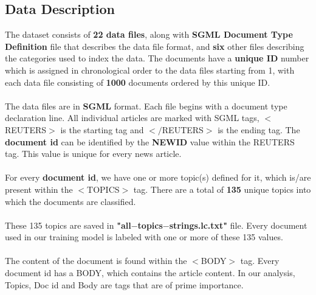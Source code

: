 \documentclass[fleqn,10pt]{SelfArx} %
\begin{document}
\subsection{Data Description}
The dataset consists of \textbf{22 data files}, along with \textbf{SGML Document Type Definition} file that describes the data file
format, and \textbf{six} other files describing the categories used to index the data. The documents have a \textbf{unique ID}
number which is assigned in chronological order to the data files starting from 1, with each data file consisting of
\textbf{1000} documents ordered by this unique ID.\\\\The data files are in \textbf{SGML} format. Each file begins with a document type declaration line. All individual articles
are marked with SGML tags, $<$REUTERS$>$ is the starting tag and $</$REUTERS$>$ is the ending tag.
The \textbf{document id} can be identified by the \textbf{NEWID} value within the REUTERS tag. This value is unique for every news article.
\\\\For every \textbf{document id}, we have one or more topic(s) defined for it, which is/are present within the $<$TOPICS$>$ tag. There are a total of \textbf{135} unique topics into which the documents are classified.
\\\\These 135 topics are saved in \textbf{"all$-$topics$-$strings.lc.txt"} file. Every document used in our training model is labeled with one or more of these 135 values. 
\\\\The content of the document is found within the $<$BODY$>$ tag. Every document id has a BODY, which contains the article content. In our analysis,  Topics, Doc id and Body are tags that are of prime importance.
\end{document}
